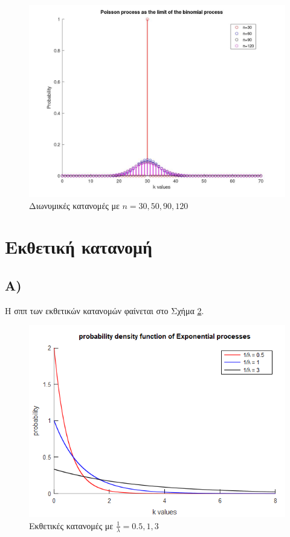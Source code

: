 \documentclass{article}
\begin{document}
\begin{figure}
    \centering
    \includegraphics[width=\textwidth]{binom_to_poisson.jpg}
    \caption{Διωνυμικές κατανομές με $n = {30, 50, 90, 120}$}
    \label{fig:binom_to_poisson}
\end{figure}

\section*{Εκθετική κατανομή}

\subsection*{Α)}

Η σππ των εκθετικών κατανομών φαίνεται στο Σχήμα \ref{fig:exponential}.

\begin{figure}
    \centering
    \includegraphics[width=\textwidth]{exponential.png}
    \caption{Εκθετικές κατανομές με $\frac{1}{λ} = {0.5, 1, 3}$}
    \label{fig:exponential}
\end{figure}
\end{document}
